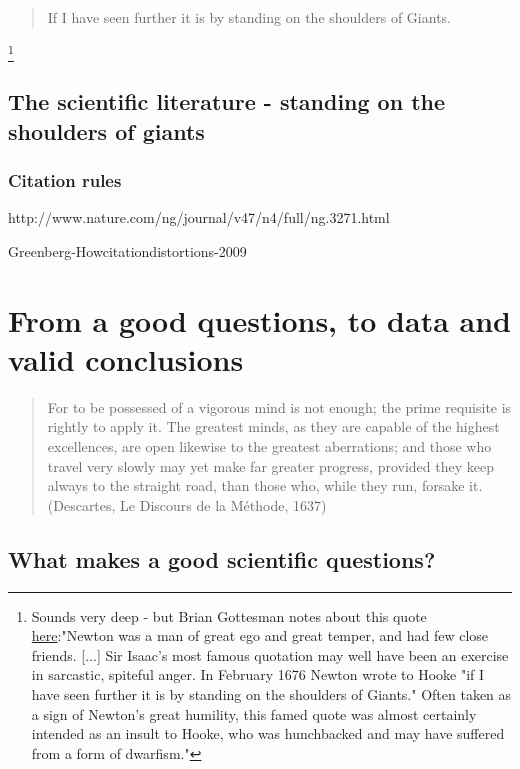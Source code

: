 \documentclass{tufte-book}
\begin{document}
\begin{quote}
If I have seen further it is by standing on the shoulders of Giants.
\end{quote}
\footnote{Sounds very deep - but Brian Gottesman notes about this quote \href{http://mentalfloss.com/article/24520/6-things-you-should-know-about-isaac-newton}{here}:"Newton was a man of great ego and great temper, and had few close friends. [...] Sir Isaac's most famous quotation may well have been an exercise in sarcastic, spiteful anger. In February 1676 Newton wrote to Hooke "if I have seen further it is by standing on the shoulders of Giants." Often taken as a sign of Newton's great humility, this famed quote was almost certainly intended as an insult to Hooke, who was hunchbacked and may have suffered from a form of dwarfism."}




\section{The scientific literature - standing on the shoulders of giants}


\subsection{Citation rules}

http://www.nature.com/ng/journal/v47/n4/full/ng.3271.html

Greenberg-Howcitationdistortions-2009






\chapter{From a good questions, to data and valid conclusions}

\begin{quote}
For to be possessed of a vigorous mind is not enough; the prime requisite is rightly to apply it. The greatest minds, as they are capable of the highest excellences, are open likewise to the greatest aberrations; and those who travel very slowly may yet make far greater progress, provided they keep always to the straight road, than those who, while they run, forsake it. (Descartes, Le Discours de la Méthode, 1637) 
\end{quote}


\section{What makes a good scientific questions?}
\end{document}

